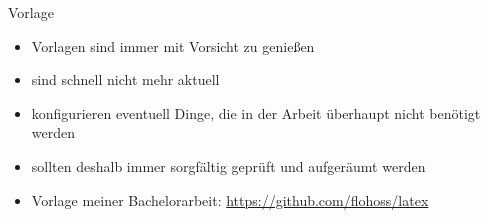 \documentclass[presentation,aspectratio=169]{beamer}
\begin{document}
\begin{frame}{Vorlage}
  \begin{itemize}
    \item Vorlagen sind immer mit Vorsicht zu genießen
    \item sind schnell nicht mehr aktuell
    \item konfigurieren eventuell Dinge, die in der Arbeit überhaupt nicht benötigt werden
    \item sollten deshalb immer sorgfältig geprüft und aufgeräumt werden
    \vspace{1em}
    \item Vorlage meiner Bachelorarbeit: \href{https://github.com/flohoss/latex}{https://github.com/flohoss/latex}
  \end{itemize}
\end{frame}
\end{document}

